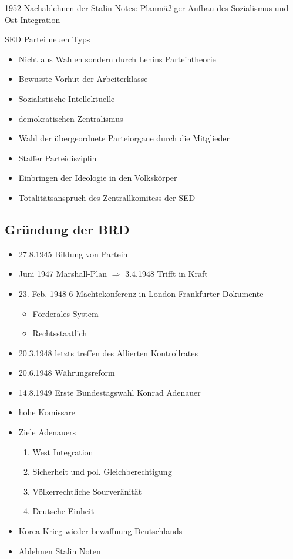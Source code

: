 \documentclass[12pt]{article}
\begin{document}
1952 Nachablehnen der Stalin-Notes: Planmäßiger Aufbau des Sozialismus und Ost-Integration

SED Partei neuen Typs
\begin{itemize}
	\item Nicht aus Wahlen sondern durch Lenins Parteintheorie
	\item Bewusste Vorhut der Arbeiterklasse
	\item Sozialistische Intellektuelle 
	\item demokratischen Zentralismus
	\item Wahl der übergeordnete Parteiorgane durch die Mitglieder
	\item Staffer Parteidisziplin 
	\item Einbringen der Ideologie in den Volkskörper
	\item Totalitätsanspruch des Zentrallkomitess der SED
\end{itemize}

\subsection*{Gründung der BRD}

\begin{itemize}
	\item 27.8.1945 Bildung von Partein
	\item Juni 1947 Marshall-Plan $\Rightarrow$ 3.4.1948 Trifft in Kraft
	\item 23. Feb. 1948 6 Mächtekonferenz in London Frankfurter Dokumente
	\begin{itemize}
		\item Förderales System
		\item Rechtsstaatlich
	\end{itemize}
	\item 20.3.1948 letzts treffen des Allierten Kontrollrates
	\item 20.6.1948 Währungsreform
	\item 14.8.1949 Erste Bundestagswahl Konrad Adenauer
	\item hohe Komissare
	\item Ziele Adenauers
	\begin{enumerate}
		\item West Integration
		\item Sicherheit und pol. Gleichberechtigung
		\item Völkerrechtliche Sourveränität
		\item Deutsche Einheit
	\end{enumerate}
	\item Korea Krieg wieder bewaffnung Deutschlands
	\item Ablehnen Stalin Noten
\end{itemize}
\end{document}
